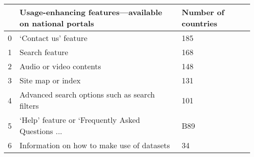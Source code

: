 \begin{tabular}{lll}
\toprule
{} & Usage-enhancing features—available on national portals & Number of countries \\
\midrule
0 &                               ‘Contact us’ feature &                 185 \\
1 &                                     Search feature &                 168 \\
2 &                            Audio or video contents &                 148 \\
3 &                                  Site map or index &                 131 \\
4 &     Advanced search options such as search filters &                 101 \\
5 &  ‘Help’ feature or ‘Frequently Asked Questions ... &                 B89 \\
6 &         Information on how to make use of datasets &                  34 \\
\bottomrule
\end{tabular}

